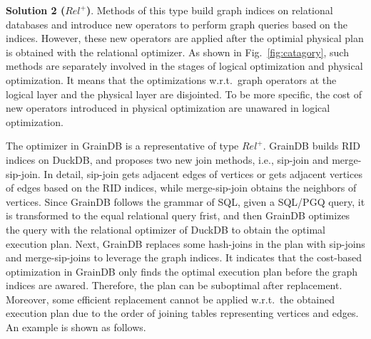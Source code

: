 \textbf{Solution 2 ($Rel^+$)}.
Methods of this type build graph indices on relational databases and introduce new operators to perform graph queries based on the indices.
However, these new operators are applied after the optimial physical plan is obtained with the relational optimizer.
As shown in Fig.~\ref{fig:catagory}, such methods are separately involved in the stages of logical optimization and physical optimization.
It means that the optimizations w.r.t.~graph operators at the logical layer and the physical layer are disjointed.
To be more specific, the cost of new operators introduced in physical optimization are unawared in logical optimization.

The optimizer in GrainDB is a representative of type $Rel^+$.
GrainDB builds RID indices on DuckDB, and proposes two new join methods, i.e., sip-join and merge-sip-join.
In detail, sip-join gets adjacent edges of vertices or gets adjacent vertices of edges based on the RID indices, while merge-sip-join obtains the neighbors of vertices.
Since GrainDB follows the grammar of SQL, given a SQL/PGQ query, it is transformed to the equal relational query frist, and then GrainDB optimizes the query with the relational optimizer of DuckDB to obtain the optimal execution plan.
Next, GrainDB replaces some hash-joins in the plan with sip-joins and merge-sip-joins to leverage the graph indices.
It indicates that the cost-based optimization in GrainDB only finds the optimal execution plan before the graph indices are awared.
Therefore, the plan can be suboptimal after replacement.
Moreover, some efficient replacement cannot be applied w.r.t.~the obtained execution plan due to the order of joining tables representing vertices and edges.
An example is shown as follows.

